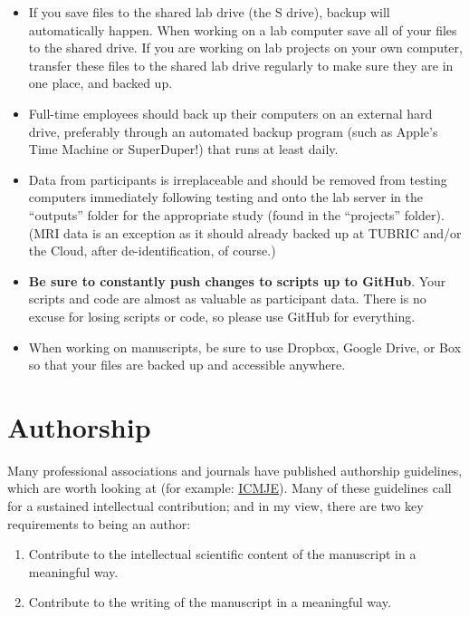 \documentclass[letterpaper,12pt,oneside]{memoir}
\begin{document}
{\begin{itemize}
\item If you save files to the shared lab drive (the S drive), backup will automatically happen. When working on a lab computer save all of your files to the shared drive. If you are working on lab projects on your own computer, transfer these files to the shared lab drive regularly to make sure they are in one place, and backed up.
\item Full-time employees should back up their computers on an external hard drive, preferably through an automated backup program (such as Apple's Time Machine or SuperDuper!) that runs at least daily.
\item Data from participants is irreplaceable and should be removed from testing computers immediately following testing and onto the lab server in the ``outputs'' folder for the appropriate study (found in the ``projects'' folder). (MRI data is an exception as it should already backed up at TUBRIC and/or the Cloud, after de-identification, of course.)
\item \textbf{Be sure to constantly push changes to scripts up to GitHub}. Your scripts and code are almost as valuable as participant data. There is no excuse for losing scripts or code, so please use GitHub for everything.
\item When working on manuscripts, be sure to use Dropbox, Google Drive, or Box so that your files are backed up and accessible anywhere.
\end{itemize}


\section{Authorship}
Many professional associations and journals have published authorship guidelines, which are worth looking at (for example: \href{http://www.icmje.org/recommendations/browse/roles-and-responsibilities/defining-the-role-of-authors-and-contributors.html}{ICMJE}). Many of these guidelines call for a sustained intellectual contribution; and in my view, there are two key requirements to being an author:

\begin{enumerate}
\item Contribute to the intellectual scientific content of the manuscript in a meaningful way.
\item Contribute to the writing of the manuscript in a meaningful way.
\end{enumerate}

}
\end{document}
